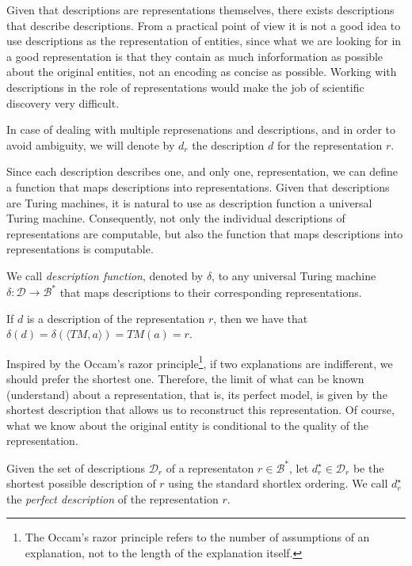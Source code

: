 Given that descriptions are representations themselves, there exists descriptions that describe descriptions. From a practical point of view it is not a good idea to use descriptions as the representation of entities, since what we are looking for in a good representation is that they contain as much inforformation as possible about the original entities, not an encoding as concise as possible. Working with descriptions in the role of representations would make the job of scientific discovery very difficult.

\begin{notation}
In case of dealing with multiple represenations and descriptions, and in order to avoid ambiguity, we will denote by $d_r$ the description $d$ for the representation $r$.
\end{notation}

Since each description describes one, and only one, representation, we can define a function that maps descriptions into representations. Given that descriptions are Turing machines, it is natural to use as description function a universal Turing machine. Consequently, not only the individual descriptions of representations are computable, but also the function that maps descriptions into representations is computable.

\begin{definition}
We call \emph{description function}, denoted by $\delta$, to any universal Turing machine $\delta : \mathcal{D} \rightarrow \mathcal{B}^\ast$ that maps descriptions to their corresponding representations.
\end{definition}

If $d$ is a description of the representation $r$, then we have that $\delta \left( d \right) = \delta \left( \langle TM, a \rangle \right) = TM(a) = r$.

Inspired by the Occam's razor principle\footnote{The Occam's razor principle refers to the number of assumptions of an explanation, not to the length of the explanation itself.}, if two explanations are indifferent, we should prefer the shortest one. Therefore, the limit of what can be known (understand) about a representation, that is, its perfect model, is given by the shortest description that allows us to reconstruct this representation. Of course, what we know about the original entity is conditional to the quality of the representation.

\begin{definition}
\label{def:descriptions_perfect_model}
Given the set of descriptions $\mathcal{D}_r$ of a representaton $r \in \mathcal{B}^\ast$, let $d_r^{\star} \in \mathcal{D}_r$ be the shortest possible description of $r$ using the standard shortlex ordering. We call $d_r^{\star}$ the \emph{perfect description} of the representation $r$.
\end{definition}

